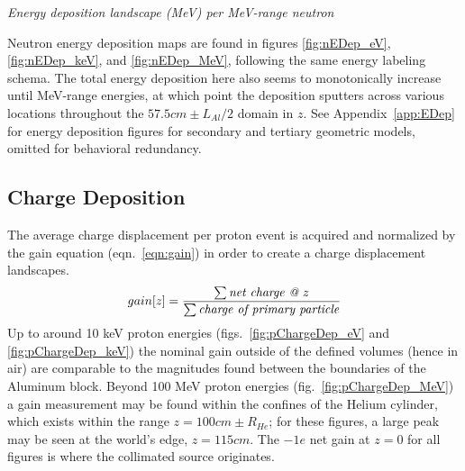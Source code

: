 \documentclass[11pt]{article}
\makeatletter
\newenvironment{figurehere}
{\def\@captype{figure}}{}
\makeatother
\begin{document}
\begin{multicols}{2}
\begin{figurehere}
\centering
{}
\caption{\small \emph{Energy deposition landscape (MeV) per MeV-range neutron}}
\label{fig:nEDep_MeV}
\end{figurehere}
\vspace{0.2 cm}

Neutron energy deposition maps are found in figures \ref{fig:nEDep_eV}, \ref{fig:nEDep_keV}, and \ref{fig:nEDep_MeV}, following the same energy labeling schema.  The total energy deposition here also seems to monotonically increase until MeV-range energies, at which point the deposition sputters across various locations throughout the $57.5 cm \pm L_{Al}/2$ domain in $z$.  See Appendix~\ref{app:EDep} for energy deposition figures for secondary and tertiary geometric models, omitted for behavioral redundancy.


\subsection{Charge Deposition}

The average charge displacement per proton event is acquired and normalized by the gain equation (eqn.~\ref{eqn:gain}) in order to create a charge displacement landscapes.
\begin{equation}
  gain[z] = \frac{\sum \text{\emph{net charge @ $z$}} }{\sum \text{\emph{charge of primary particle}} } \label{eqn:gain}
\end{equation}
Up to around 10 keV proton energies (figs.~\ref{fig:pChargeDep_eV} and \ref{fig:pChargeDep_keV}) the nominal gain outside of the defined volumes (hence in air) are comparable to the magnitudes found between the boundaries of the Aluminum block.  Beyond 100 MeV proton energies (fig.~\ref{fig:pChargeDep_MeV}) a gain measurement may be found within the confines of the Helium cylinder, which exists within the range $z=100 cm \pm R_{He}$; for these figures, a large peak may be seen at the world's edge, $z=115 cm$.  The $-1e$ net gain at $z=0$ for all figures is where the collimated source originates.


\end{multicols}
\end{document}
